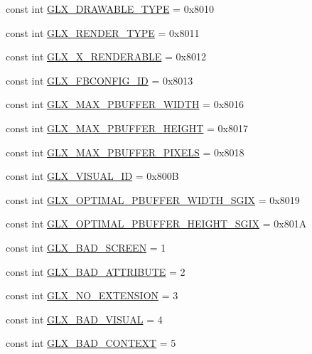 \begin{DoxyCompactItemize}
\item 
const int \hyperlink{class_tao_1_1_platform_1_1_x11_1_1_glx_abd580356fe0bc30ae3eb7d3fd85b66a0}{GLX\_\-DRAWABLE\_\-TYPE} = 0x8010
\item 
const int \hyperlink{class_tao_1_1_platform_1_1_x11_1_1_glx_a34fd97e1e32bc93a6fb58867f3d14879}{GLX\_\-RENDER\_\-TYPE} = 0x8011
\item 
const int \hyperlink{class_tao_1_1_platform_1_1_x11_1_1_glx_af839e96ef74a4a68ba5f6b93012f804c}{GLX\_\-X\_\-RENDERABLE} = 0x8012
\item 
const int \hyperlink{class_tao_1_1_platform_1_1_x11_1_1_glx_a9058319d3f2837e9c43e7822f0ce1f53}{GLX\_\-FBCONFIG\_\-ID} = 0x8013
\item 
const int \hyperlink{class_tao_1_1_platform_1_1_x11_1_1_glx_a94799aa9360ef6848752dc1cffbf2e09}{GLX\_\-MAX\_\-PBUFFER\_\-WIDTH} = 0x8016
\item 
const int \hyperlink{class_tao_1_1_platform_1_1_x11_1_1_glx_aace265087d8b7559282f6b773c747b75}{GLX\_\-MAX\_\-PBUFFER\_\-HEIGHT} = 0x8017
\item 
const int \hyperlink{class_tao_1_1_platform_1_1_x11_1_1_glx_a9824a3a00017f01c9afc95553a295504}{GLX\_\-MAX\_\-PBUFFER\_\-PIXELS} = 0x8018
\item 
const int \hyperlink{class_tao_1_1_platform_1_1_x11_1_1_glx_a6e069356f6070485b2c4d0d8224aa167}{GLX\_\-VISUAL\_\-ID} = 0x800B
\item 
const int \hyperlink{class_tao_1_1_platform_1_1_x11_1_1_glx_ab87b4beadb6382fd25ce4f4f320055a9}{GLX\_\-OPTIMAL\_\-PBUFFER\_\-WIDTH\_\-SGIX} = 0x8019
\item 
const int \hyperlink{class_tao_1_1_platform_1_1_x11_1_1_glx_af47ec9964a832b5f77fb66616d845771}{GLX\_\-OPTIMAL\_\-PBUFFER\_\-HEIGHT\_\-SGIX} = 0x801A
\item 
const int \hyperlink{class_tao_1_1_platform_1_1_x11_1_1_glx_a4c3bdd23294091a4dc4462822a496b18}{GLX\_\-BAD\_\-SCREEN} = 1
\item 
const int \hyperlink{class_tao_1_1_platform_1_1_x11_1_1_glx_a514b1a15b854a85a00604567fe0cb57d}{GLX\_\-BAD\_\-ATTRIBUTE} = 2
\item 
const int \hyperlink{class_tao_1_1_platform_1_1_x11_1_1_glx_a4964628e8c7c0a05fa0c8cf3739770b7}{GLX\_\-NO\_\-EXTENSION} = 3
\item 
const int \hyperlink{class_tao_1_1_platform_1_1_x11_1_1_glx_a884e10d10c755a6a3e17018169cf9117}{GLX\_\-BAD\_\-VISUAL} = 4
\item 
const int \hyperlink{class_tao_1_1_platform_1_1_x11_1_1_glx_a85f4c8fd7b882705d0a2ab33842385b6}{GLX\_\-BAD\_\-CONTEXT} = 5

\end{DoxyCompactItemize}
